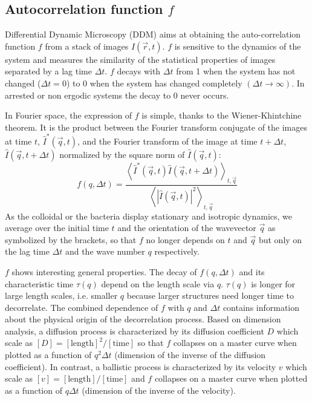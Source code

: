 \documentclass[prb,twocolumn,amsmath,amssymb]{revtex4-1}
\newcommand{\tgn}[1]{{\color{blue}#1}} %
\begin{document}
\subsection{Autocorrelation function $f$}
\label{sec:ddm1}

\tgn{Differential Dynamic Microscopy (DDM) aims at obtaining the auto-correlation function $f$\cite{ajp1995passmore} from a stack of images $I(\vec{r}, t)$. $f$ is sensitive to the dynamics of the system and measures the similarity of the statistical properties of images separated by a lag time $\Delta t$. 
$f$ decays with $\Delta t$ from 1 when the system has not changed ($\Delta t=0$) to 0 when the system has changed completely $(\Delta t\rightarrow\infty)$. In arrested or non ergodic systems the decay to 0 never occurs.

In Fourier space, the expression of $f$ is simple,  thanks to the Wiener-Khintchine theorem. It is the product between the Fourier transform conjugate of the images at time $t$,  $\hat{I}^*(\vec{q}, t)$, and the Fourier transform of the image at time $t+\Delta t$, $\hat{I}(\vec{q}, t+\Delta t)$ normalized by the square norm of $\hat{I}(\vec{q}, t)$:
\begin{equation}
f(q, \Delta t) =\frac{\left\langle \hat{I}^*(\vec{q}, t) \hat{I}(\vec{q}, t+\Delta t) \right\rangle_{t, \vec{q}}}{\left\langle | \widehat{I}(\vec{q},t)|^2  \right\rangle_{t, \vec{q}} }
\label{eq:f}
\end{equation}
As the colloidal or the bacteria display stationary and  isotropic dynamics, we average over the initial time $t$ and the orientation of the wavevector $\vec{q}$ as symbolized by the brackets, so that $f$ no longer depends on $t$ and $\vec{q}$  but only on the lag time $\Delta t$ and the wave number $q$ respectively. 

$f$ shows interesting general properties. The decay of $f(q, \Delta t)$ and its characteristic time $\tau(q)$ depend on the length scale via $q$. $\tau(q)$ is longer for large length scales, i.e. smaller $q$ because larger structures need longer time to decorrelate. The combined dependence of $f$ with $q$ and $\Delta t$ contains information about the physical origin of the decorrelation process. Based on dimension analysis, a diffusion process is characterized by its diffusion coefficient $D$ which scale as $[D]=[\text{length}]^2/[\text{time}]$ so that $f$ collapses on a master curve when plotted as a function of $q^2\Delta t$ (dimension of the inverse of the diffusion coefficient). In contrast, a ballistic process is characterized by its velocity $v$ which scale as $[v]=[\text{length}]/[\text{time}]$ and  $f$ collapses on a master curve when plotted as a function of $q\Delta t$ (dimension of the inverse of the velocity).

}
\end{document}
